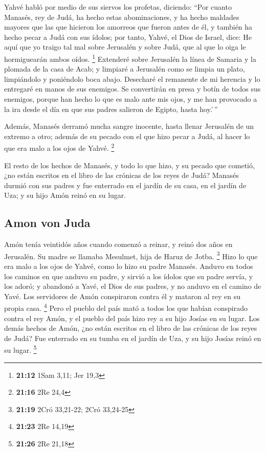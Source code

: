  Yahvé habló por medio de sus siervos los profetas,
diciendo:  ``Por cuanto Manasés, rey de Judá, ha hecho
estas abominaciones, y ha hecho maldades mayores que las que hicieron
los amorreos que fueron antes de él, y también ha hecho pecar a Judá con
sus ídolos;  por tanto, Yahvé, el Dios de Israel, dice:
He aquí que yo traigo tal mal sobre Jerusalén y sobre Judá, que al que
lo oiga le hormiguearán ambos oídos. \footnote{\textbf{21:12} 1Sam 3,11;
  Jer 19,3}  Extenderé sobre Jerusalén la línea de
Samaria y la plomada de la casa de Acab; y limpiaré a Jerusalén como se
limpia un plato, limpiándolo y poniéndolo boca abajo. 
Desecharé el remanente de mi herencia y lo entregaré en manos de sus
enemigos. Se convertirán en presa y botín de todos sus enemigos,
 porque han hecho lo que es malo ante mis ojos, y me han
provocado a la ira desde el día en que sus padres salieron de Egipto,
hasta hoy.'\,''

 Además, Manasés derramó mucha sangre inocente, hasta
llenar Jerusalén de un extremo a otro; además de su pecado con el que
hizo pecar a Judá, al hacer lo que era malo a los ojos de Yahvé.
\footnote{\textbf{21:16} 2Re 24,4}

 El resto de los hechos de Manasés, y todo lo que hizo, y
su pecado que cometió, ¿no están escritos en el libro de las crónicas de
los reyes de Judá?  Manasés durmió con sus padres y fue
enterrado en el jardín de su casa, en el jardín de Uza; y su hijo Amón
reinó en su lugar.

\hypertarget{amon-von-juda}{%
\subsection{Amon von Juda}\label{amon-von-juda}}

 Amón tenía veintidós años cuando comenzó a reinar, y
reinó dos años en Jerusalén. Su madre se llamaba Mesulmet, hija de Haruz
de Jotba. \footnote{\textbf{21:19} 2Cró 33,21-22; 2Cró 33,24-25}
 Hizo lo que era malo a los ojos de Yahvé, como lo hizo
su padre Manasés.  Anduvo en todos los caminos en que
anduvo su padre, y sirvió a los ídolos que su padre servía, y los adoró;
 y abandonó a Yavé, el Dios de sus padres, y no anduvo en
el camino de Yavé.  Los servidores de Amón conspiraron
contra él y mataron al rey en su propia casa. \footnote{\textbf{21:23}
  2Re 14,19}  Pero el pueblo del país mató a todos los
que habían conspirado contra el rey Amón, y el pueblo del país hizo rey
a su hijo Josías en su lugar.  Los demás hechos de Amón,
¿no están escritos en el libro de las crónicas de los reyes de Judá?
 Fue enterrado en su tumba en el jardín de Uza, y su hijo
Josías reinó en su lugar. \footnote{\textbf{21:26} 2Re 21,18}

